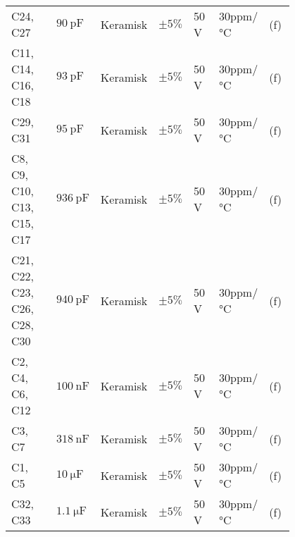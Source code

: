\begin{table}[h!]
\begin{threeparttable}
\begin{tabular}{p{0.2\linewidth}p{0.1\linewidth}p{0.15\linewidth}p{0.05\linewidth}p{0.1\linewidth}p{0.1\linewidth}p{0.1\linewidth}}
C24, C27 & $\SI{90}{\pico\farad}$ & Keramisk & $\pm 5\%$ & 50 \si{\volt} & 30ppm/\si{\celsius} & (f)\\
C11, C14, C16, C18 & $\SI{93}{\pico\farad}$ & Keramisk & $\pm 5\%$ & 50 \si{\volt} & 30ppm/\si{\celsius} & (f)\\
C29, C31 & $\SI{95}{\pico\farad}$ & Keramisk & $\pm 5\%$ & 50 \si{\volt} & 30ppm/\si{\celsius} & (f)\\
C8, C9, C10, C13, C15, C17 & $\SI{936}{\pico\farad}$ & Keramisk & $\pm 5\%$ & 50 \si{\volt} & 30ppm/\si{\celsius} & (f)\\
C21, C22, C23, C26, C28, C30 & $\SI{940}{\pico\farad}$ & Keramisk & $\pm 5\%$ & 50 \si{\volt} & 30ppm/\si{\celsius} & (f)\\
C2, C4, C6, C12 & $\SI{100}{\nano\farad}$ & Keramisk & $\pm 5\%$ & 50 \si{\volt} & 30ppm/\si{\celsius} & (f)\\
C3, C7  & $\SI{318}{\nano\farad}$ & Keramisk & $\pm 5\%$ & 50 \si{\volt} & 30ppm/\si{\celsius} & (f)\\
C1, C5 & $\SI{10}{\micro\farad}$ & Keramisk & $\pm 5\%$ & 50 \si{\volt} & 30ppm/\si{\celsius} & (f)\\
C32, C33 & $\SI{1.1}{\micro\farad}$ & Keramisk & $\pm 5\%$ & 50 \si{\volt} & 30ppm/\si{\celsius} & (f)\\


\end{tabular}
\end{threeparttable}
\end{table}
